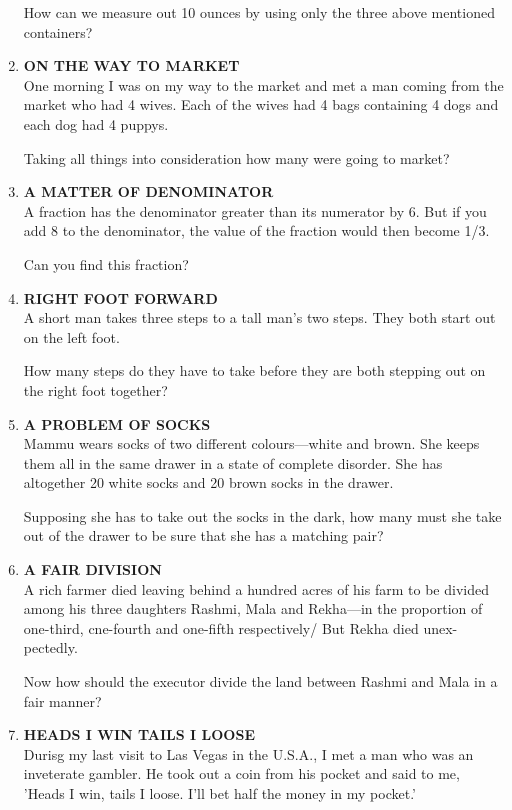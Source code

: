 \documentclass[12pt]{article}
\begin{document}
\begin{enumerate}
How can we measure  out  10 ounces  by using  only  the three above  mentioned  containers? 
%
\item \textbf{ON  THE  WAY  TO MARKET} \\
One morning  I was on  my way  to the market  and met  a man coming from the market who had 4 wives.  Each  of the  wives  had  4 bags containing  4 dogs  and each  dog had 4 puppys. 

Taking  all things  into  consideration  how  many  were going  to market? 
%
\item \textbf{A  MATTER  OF  DENOMINATOR} \\
A fraction  has the denominator  greater  than  its numerator by 6. But  if you add 8 to the denominator,  the value  of the fraction  would  then  become  1/3.

Can you  find  this fraction? 
%
\item \textbf{RIGHT  FOOT  FORWARD} \\
A short  man  takes  three  steps  to a tall man's  two  steps. They  both  start  out on the left foot.  

How  many  steps  do they have  to take  before  they  are both  stepping  out on the right  foot  together? 
%
\item \textbf{A  PROBLEM  OF SOCKS} \\ 
Mammu  wears  socks  of two  different  colours—white and brown.  She  keeps  them  all in the same  drawer  in a state of complete  disorder. She has altogether  20 white  socks  and 20 brown  socks in the drawer.  

Supposing  she has to take  out the socks  in the dark,  how  many  must  she take  out of the drawer  to be sure  that she has a matching  pair? 
%
\item \textbf{A  FAIR  DIVISION}\\ 
A rich farmer  died  leaving  behind  a hundred  acres  of his farm  to be divided  among  his three  daughters  Rashmi, Mala  and  Rekha—in  the  proportion  of one-third,  cne-fourth  and one-fifth  respectively/  But  Rekha  died  unex-pectedly. 

Now  how  should  the executor  divide  the land  between Rashmi  and Mala  in a fair  manner? 
%
\item \textbf{HEADS  I WIN  TAILS  I LOOSE} \\
Durisg  my last visit  to Las Vegas  in the U.S.A.,  I met  a man who  was an inveterate  gambler.  He  took  out  a coin from  his pocket  and said  to me, 'Heads  I win,  tails  I loose. I'll bet half  the money  in my pocket.' 


\end{enumerate}
\end{document}
